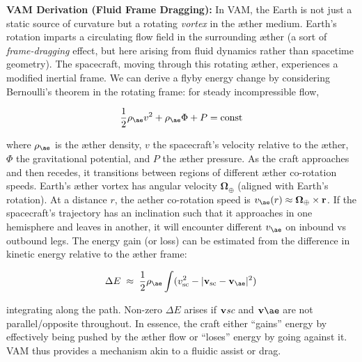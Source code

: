 \documentclass[a4paper, aps,preprint,superscriptaddress, 12pt]{revtex4}
\begin{document}
\textbf{VAM Derivation (Fluid Frame Dragging):} In VAM, the Earth is not just a static source of curvature but a rotating \textit{vortex} in the æther medium. Earth’s rotation imparts a circulating flow field in the surrounding æther (a sort of \textit{frame-dragging} effect, but here arising from fluid dynamics rather than spacetime geometry). The spacecraft, moving through this rotating æther, experiences a modified inertial frame. We can derive a flyby energy change by considering Bernoulli’s theorem in the rotating frame: for steady incompressible flow,

\begin{equation}
    \frac{1}{2}\rho_{\ae} v^2 + \rho_{\ae} \Phi + P = \text{const}
\end{equation}

where $\rho_{\ae}$ is the æther density, $v$ the spacecraft’s velocity relative to the æther, $\Phi$ the gravitational potential, and $P$ the æther pressure. As the craft approaches and then recedes, it transitions between regions of different æther co-rotation speeds. Earth’s æther vortex has angular velocity $\boldsymbol\Omega_{\oplus}$ (aligned with Earth’s rotation). At a distance $r$, the aether co-rotation speed is $v_{\ae}(r)\approx \boldsymbol\Omega_{\oplus}\times \mathbf{r}$. If the spacecraft’s trajectory has an inclination such that it approaches in one hemisphere and leaves in another, it will encounter different $v_{\ae}$ on inbound vs outbound legs. The energy gain (or loss) can be estimated from the difference in kinetic energy relative to the æther frame:

\begin{equation}
    \Delta E \;\approx\; \frac{1}{2} \rho_{\ae} \int (v_{\text{sc}}^2 - |\mathbf{v}_{\text{sc}}-\mathbf{v}_{\ae}|^2)\,
\end{equation}

integrating along the path. Non-zero $\Delta E$ arises if $\mathbf{v}\textit{\text{sc}}$ and $\mathbf{v}{\ae}$ are not parallel/opposite throughout. In essence, the craft either “gains” energy by effectively being pushed by the æther flow or “loses” energy by going against it. VAM thus provides a mechanism akin to a fluidic assist or drag.
\end{document}
